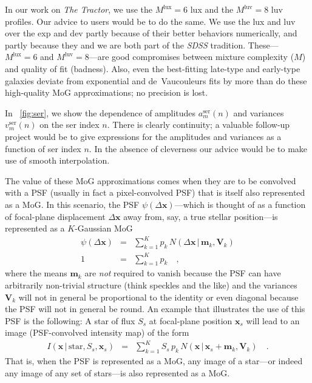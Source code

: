 \documentclass[12pt,pdftex,preprint]{aastex}
\newcommand{\project}[1]{\textsl{#1}}
\newcommand{\tmatrix}[1]{\boldsymbol{#1}}
\newcommand{\tvector}[1]{\boldsymbol{#1}}
\newcommand{\pos}{\tvector{x}}
\newcommand{\mean}{\tvector{m}}
\newcommand{\var}{\tmatrix{V}}
\newcommand{\normal}{N}
\newcommand{\given}{\,|\,}
\renewcommand{\star}{\mathrm{star}}
\newcommand{\ser}{\mathrm{ser}}
\newcommand{\lux}{\mathrm{lux}}
\newcommand{\luv}{\mathrm{luv}}
\begin{document}
In our work on \project{The Tractor}, we use the $M^{\lux}=6$ lux and
the $M^{\luv}=8$ luv profiles.  Our advice to users would be to do the
same.  We use the lux and luv over the exp and dev partly because of
their better behaviors numerically, and partly because they and we are
both part of the \project{SDSS} tradition.  These---$M^{\lux}=6$ and
$M^{\luv}=8$---are good compromises between mixture complexity ($M$)
and quality of fit (badness).  Also, even the best-fitting late-type
and early-type galaxies deviate from exponential and de~Vaucouleurs
fits by more than do these high-quality MoG approximations; no
precision is lost.

In \figurename~\ref{fig:ser}, we show the dependence of amplitudes
$a^{\ser}_m(n)$ and variances $v^{\ser}_m(n)$ on the ser index $n$.
There is clearly continuity; a valuable follow-up project would be to
give expressions for the amplitudes and variances as a function of ser
index $n$.  In the absence of cleverness our advice would be to make
use of smooth interpolation.

The value of these MoG approximations comes when they are to be
convolved with a PSF (usually in fact a pixel-convolved PSF) that is
itself also represented as a MoG.  In this scenario, the PSF
$\psi(\Delta\pos)$---which is thought of as a function of focal-plane
displacement $\Delta\pos$ away from, say, a true stellar position---is
represented as a $K$-Gaussian MoG
\begin{eqnarray}\displaystyle
\psi(\Delta\pos) &=& \sum_{k=1}^K p_k\,\normal(\Delta\pos\given\mean_k,\var_k)
\\
1 &=& \sum_{k=1}^K p_k
\quad ,
\end{eqnarray}
where the means $\mean_k$ are \emph{not} required to vanish because
the PSF can have arbitrarily non-trivial structure (think speckles and
the like) and the variances $\var_k$ will not in general be
proportional to the identity or even diagonal because the PSF will not
in general be round.  An example that illustrates the use of this PSF
is the following: A star of flux $S_s$ at focal-plane position
$\pos_s$ will lead to an image (PSF-convolved intensity map) of the
form
\begin{eqnarray}\displaystyle
I(\pos\given\star,S_s,\pos_s) &=& \sum_{k=1}^K S_s\,p_k\,\normal(\pos\given\pos_s+\mean_k,\var_k)
\quad .
\end{eqnarray}
That is, when the PSF is represented as a MoG, any image of a
star---or indeed any image of any set of stars---is also represented
as a MoG.
\end{document}
